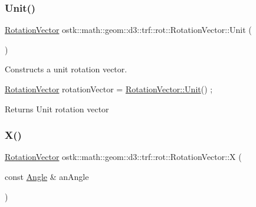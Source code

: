 \subsubsection{\texorpdfstring{Unit()}{Unit()}}
{\footnotesize\ttfamily \hyperlink{classostk_1_1math_1_1geom_1_1d3_1_1trf_1_1rot_1_1_rotation_vector}{Rotation\+Vector} ostk\+::math\+::geom\+::d3\+::trf\+::rot\+::\+Rotation\+Vector\+::\+Unit (\begin{DoxyParamCaption}{ }\end{DoxyParamCaption})\hspace{0.3cm}{\ttfamily [static]}}



Constructs a unit rotation vector. 


\begin{DoxyCode}
\hyperlink{classostk_1_1math_1_1geom_1_1d3_1_1trf_1_1rot_1_1_rotation_vector_ad05e6af649dbdd145793773e2ab1cdce}{RotationVector} rotationVector = \hyperlink{classostk_1_1math_1_1geom_1_1d3_1_1trf_1_1rot_1_1_rotation_vector_a298536fda35c1f579a96dc5eaa003b37}{RotationVector::Unit}() ;
\end{DoxyCode}


\begin{DoxyReturn}{Returns}
Unit rotation vector 
\end{DoxyReturn}
\mbox{\label{classostk_1_1math_1_1geom_1_1d3_1_1trf_1_1rot_1_1_rotation_vector_af24a0322c5b9c2bbfb745468e97147e9}} 
\subsubsection{\texorpdfstring{X()}{X()}}
{\footnotesize\ttfamily \hyperlink{classostk_1_1math_1_1geom_1_1d3_1_1trf_1_1rot_1_1_rotation_vector}{Rotation\+Vector} ostk\+::math\+::geom\+::d3\+::trf\+::rot\+::\+Rotation\+Vector\+::X (\begin{DoxyParamCaption}\item[{const \hyperlink{classostk_1_1math_1_1geom_1_1_angle}{Angle} \&}]{an\+Angle }\end{DoxyParamCaption})\hspace{0.3cm}{\ttfamily [static]}}



